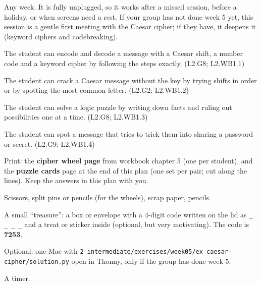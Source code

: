 
\begin{teachernote}
Any week. It is fully unplugged, so it works after a missed session, before a holiday, or when screens need a rest.
If your group has not done week 5 yet, this session is a gentle first meeting with the Caesar cipher; if they have, it deepens it
(keyword ciphers and codebreaking).
\end{teachernote}

\begin{objectives}
  \item The student can encode and decode a message with a Caesar shift, a number code and a keyword cipher by following the steps exactly. (L2.G8; L2.WB1.1)
  \item The student can crack a Caesar message without the key by trying shifts in order or by spotting the most common letter. (L2.G2; L2.WB1.2)
  \item The student can solve a logic puzzle by writing down facts and ruling out possibilities one at a time. (L2.G8; L2.WB1.3)
  \item The student can spot a message that tries to trick them into sharing a password or secret. (L2.G9; L2.WB1.4)
\end{objectives}

\begin{materials}
  \item Print: the \textbf{cipher wheel page} from workbook chapter 5 (one per student), and the \textbf{puzzle cards} page at the end of this plan
        (one set per pair; cut along the lines). Keep the answers in this plan with you.
  \item Scissors, split pins or pencils (for the wheels), scrap paper, pencils.
  \item A small \enquote{treasure}: a box or envelope with a 4-digit code written on the lid as \texttt{\_ \_ \_ \_} and a treat or sticker inside
        (optional, but very motivating). The code is \textbf{7253}.
  \item Optional: one Mac with \texttt{2-intermediate/exercises/week05/ex-caesar-cipher/solution.py} open in Thonny, only if the group has done week 5.
  \item A timer.
\end{materials}

